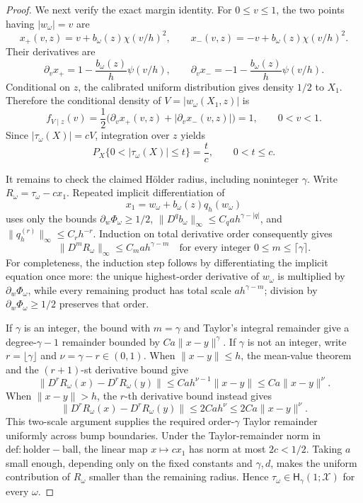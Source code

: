 \documentclass{article}
\begin{document}
\begin{proof}
We next verify the exact margin identity. For \(0\le v\le1\), the two points having \(|w_\omega|=v\) are
\[
 x_+(v,z)=v+b_\omega(z)\chi(v/h)^2,
 \qquad
 x_-(v,z)=-v+b_\omega(z)\chi(v/h)^2.
\]
Their derivatives are
\[
 \partial_vx_+=1-\frac{b_\omega(z)}h\psi(v/h),
 \qquad
 \partial_vx_-=-1-\frac{b_\omega(z)}h\psi(v/h).
\]
Conditional on \(z\), the calibrated uniform distribution gives density \(1/2\) to \(X_1\). Therefore the conditional density of \(V=|w_\omega(X_1,z)|\) is
\[
 f_{V\mid z}(v)=\frac12\bigl(\partial_vx_+(v,z)+|\partial_vx_-(v,z)|\bigr)=1,
 \qquad 0<v<1.
\]
Since \(|\tau_\omega(X)|=cV\), integration over \(z\) yields
\[
 P_X\{0<|\tau_\omega(X)|\le t\}=\frac tc,
 \qquad 0<t\le c.
\]

It remains to check the claimed Hölder radius, including noninteger \(\gamma\). Write \(R_\omega=\tau_\omega-cx_1\). Repeated implicit differentiation of
\[
 x_1=w_\omega+b_\omega(z)q_h(w_\omega)
\]
uses only the bounds \(\partial_w\Phi_\omega\ge1/2\), \(\|D^qb_\omega\|_\infty\le C_qah^{\gamma-|q|}\), and \(\|q_h^{(r)}\|_\infty\le C_rh^{-r}\). Induction on total derivative order consequently gives
\[
 \|D^mR_\omega\|_\infty\le C_m a h^{\gamma-m}
 \quad\text{for every integer }0\le m\le\lceil\gamma\rceil.
\]
For completeness, the induction step follows by differentiating the implicit equation once more: the unique highest-order derivative of \(w_\omega\) is multiplied by \(\partial_w\Phi_\omega\), while every remaining product has total scale \(a h^{\gamma-m}\); division by \(\partial_w\Phi_\omega\ge1/2\) preserves that order.

If \(\gamma\) is an integer, the bound with \(m=\gamma\) and Taylor's integral remainder give a degree-\(\gamma-1\) remainder bounded by \(Ca\|x-y\|^\gamma\). If \(\gamma\) is not an integer, write \(r=\lfloor\gamma\rfloor\) and \(\nu=\gamma-r\in(0,1)\). When \(\|x-y\|\le h\), the mean-value theorem and the \((r+1)\)-st derivative bound give
\[
 \|D^rR_\omega(x)-D^rR_\omega(y)\|
 \le Ca h^{\nu-1}\|x-y\|
 \le Ca\|x-y\|^\nu.
\]
When \(\|x-y\|>h\), the \(r\)-th derivative bound instead gives
\[
 \|D^rR_\omega(x)-D^rR_\omega(y)\|
 \le 2Ca h^\nu
 \le2Ca\|x-y\|^\nu.
\]
This two-scale argument supplies the required order-\(\gamma\) Taylor remainder uniformly across bump boundaries. Under the Taylor-remainder norm in \(\mathrm{def:holder-ball}\), the linear map \(x\mapsto cx_1\) has norm at most \(2c<1/2\). Taking \(a\) small enough, depending only on the fixed constants and \(\gamma,d\), makes the uniform contribution of \(R_\omega\) smaller than the remaining radius. Hence \(\tau_\omega\in\mathsf H_\gamma(1;\mathcal X)\) for every \(\omega\).


\end{proof}
\end{document}
